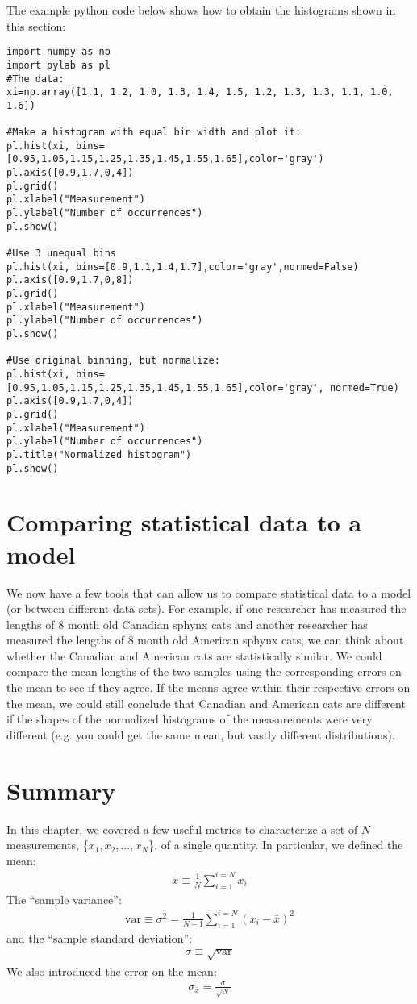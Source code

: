 The example python code below shows how to obtain the histograms shown in this section:
\begin{lstlisting}[frame=single] 
import numpy as np
import pylab as pl
#The data:
xi=np.array([1.1, 1.2, 1.0, 1.3, 1.4, 1.5, 1.2, 1.3, 1.3, 1.1, 1.0, 1.6])

#Make a histogram with equal bin width and plot it:
pl.hist(xi, bins=[0.95,1.05,1.15,1.25,1.35,1.45,1.55,1.65],color='gray')
pl.axis([0.9,1.7,0,4])
pl.grid()
pl.xlabel("Measurement")
pl.ylabel("Number of occurrences")
pl.show()

#Use 3 unequal bins
pl.hist(xi, bins=[0.9,1.1,1.4,1.7],color='gray',normed=False)
pl.axis([0.9,1.7,0,8])
pl.grid()
pl.xlabel("Measurement")
pl.ylabel("Number of occurrences")
pl.show()

#Use original binning, but normalize:
pl.hist(xi, bins=[0.95,1.05,1.15,1.25,1.35,1.45,1.55,1.65],color='gray', normed=True)
pl.axis([0.9,1.7,0,4])
pl.grid()
pl.xlabel("Measurement")
pl.ylabel("Number of occurrences")
pl.title("Normalized histogram")
pl.show()
\end{lstlisting}


\section{Comparing statistical data to a model}
We now have a few tools that can allow us to compare statistical data to a model (or between different data sets). For example, if one researcher has measured the lengths of 8 month old Canadian sphynx cats and another researcher has measured the lengths of 8 month old American sphynx cats, we can think about whether the Canadian and American cats are statistically similar. We could compare the mean lengths of the two samples using the corresponding errors on the mean to see if they agree. If the means agree within their respective errors on the mean, we could still conclude that Canadian and American cats are different if the shapes of the normalized histograms of the measurements were very different (e.g. you could get the same mean, but vastly different distributions).

\section{Summary}
In this chapter, we covered a few useful metrics to characterize a set of $N$ measurements, \{$x_1, x_2, \dots,x_N$\}, of a single quantity. In particular, we defined the mean:
\begin{align}
 \bar{x} \equiv \frac{1}{N} \sum_{i=1}^{i=N} x_i 
\end{align}
The ``sample variance'':
\begin{align}
 \text{var}\equiv \sigma^2 = \frac{1}{N-1} \sum_{i=1}^{i=N} (x_i-\bar{x})^2 
\end{align}
and the ``sample standard deviation'': 
\begin{align}
 \sigma\equiv\sqrt{\text{var}}
\end{align}
We also introduced the error on the mean:
\begin{align}
 \sigma_{\bar x}= \frac{\sigma}{\sqrt N}
\end{align}

